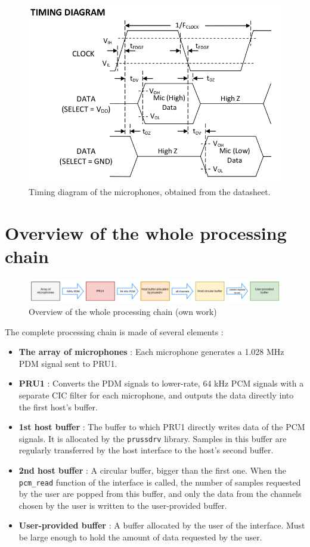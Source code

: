 \documentclass[]{report}
\providecommand{\tightlist}{%
	\setlength{\itemsep}{0pt}\setlength{\parskip}{0pt}}
\begin{document}
\begin{figure}[!b]
\centering
\includegraphics[width=0.65\linewidth]{Pictures/timing_diagram.png}
\caption{Timing diagram of the microphones, obtained from the datasheet.}
\end{figure}


\hypertarget{overview-of-the-whole-processing-chain}{%
\section{Overview of the whole processing
chain}\label{overview-of-the-whole-processing-chain}}

\begin{figure}[H]
\centering
\includegraphics[width=1.0\linewidth]{Pictures/PRU_processing_chain.png}
\caption{Overview of the whole processing chain (own work)}
\end{figure}

The complete processing chain is made of several elements :

\begin{itemize}
\tightlist
\item
  \textbf{The array of microphones} : Each microphone generates a 1.028 MHz PDM signal sent to PRU1.
\item
  \textbf{PRU1} : Converts the PDM signals to lower-rate, 64 kHz PCM signals with a separate CIC filter for each microphone, and outputs the data directly into the first host's buffer.
\item
  \textbf{1st host buffer} : The buffer to which PRU1 directly writes data of the PCM signals. It is allocated by the \texttt{prussdrv} library. Samples in this buffer are regularly transferred by the host interface to the host's second buffer.
\item
  \textbf{2nd host buffer} : A circular buffer, bigger than the first one. When the \texttt{pcm\_read} function of the interface is called, the number of samples requested by the user are popped from this buffer, and only the data from the channels chosen by the user is written to the user-provided buffer.
\item
  \textbf{User-provided buffer} : A buffer allocated by the user of the interface. Must be large enough to hold the amount of data requested by the user.
\end{itemize}
\end{document}
